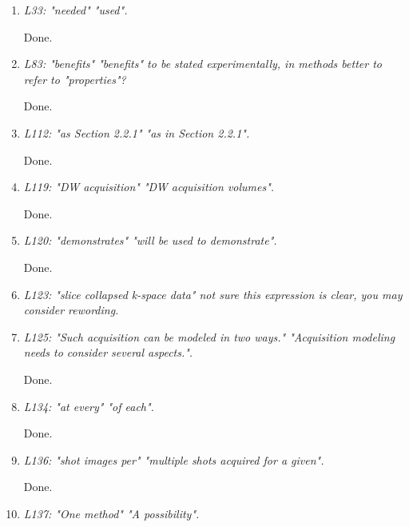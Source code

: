 \documentclass[a4paper,11pt,twoside]{report}
\begin{document}
\begin{enumerate}[resume]
    \item \textit{L33: "needed" \textrightarrow "used".}

    \hspace{1em} Done.

    \item \textit{L83: "benefits" \textrightarrow "benefits" to be stated experimentally, in methods better to refer to "properties"?}

    \hspace{1em} Done.

    \item \textit{L112: "as Section 2.2.1" \textrightarrow "as in Section 2.2.1".}

    \hspace{1em} Done.

    \item \textit{L119: "DW acquisition" \textrightarrow "DW acquisition volumes".}

    \hspace{1em} Done.

    \item \textit{L120: "demonstrates" \textrightarrow "will be used to demonstrate".}

    \hspace{1em} Done.

    \item \textit{L123: "slice collapsed k-space data" \textrightarrow not sure this expression is clear, you may consider rewording.}

    \item \textit{L125: "Such acquisition can be modeled in two ways." \textrightarrow "Acquisition modeling needs to consider several aspects.".}

    \hspace{1em} Done.

    \item \textit{L134: "at every" \textrightarrow "of each".}

    \hspace{1em} Done.

    \item \textit{L136: "shot images per" \textrightarrow "multiple shots acquired for a given".}

    \hspace{1em} Done.

    \item \textit{L137: "One method" \textrightarrow "A possibility".}


\end{enumerate}
\end{document}
